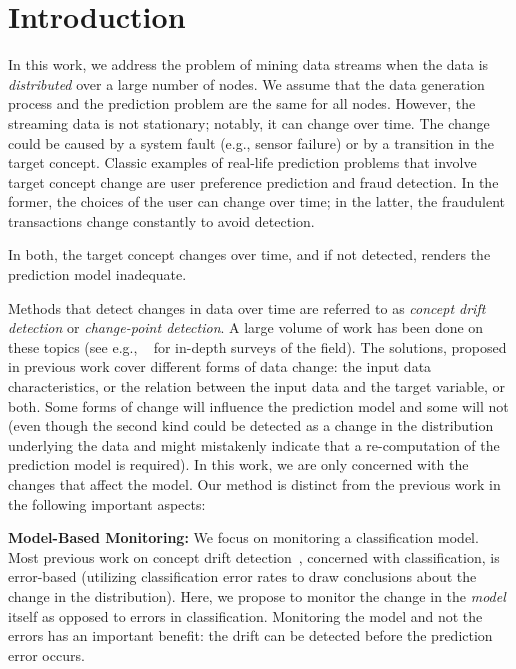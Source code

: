 \documentclass{sig-alternate-05-2015}
\begin{document}
%
%

%
%
\printccsdesc



\section{Introduction}
In this work, we address the problem of mining data streams when the data is
{\em distributed} over a large number of nodes. We assume that the data generation process and the prediction problem are the same for all nodes. However, the streaming data is not stationary; notably, it can change over time. The change could be caused by a system fault (e.g., sensor failure) or by a transition in the target concept. Classic examples of real-life prediction problems that involve target concept change are user preference prediction and fraud detection. In the former, the choices of the user can change over time; in the latter, the fraudulent transactions change constantly to avoid detection.








In both, the target concept changes over time, and if not detected, renders the prediction model inadequate.

Methods that detect changes in data over time are referred to as {\em concept drift detection} or {\em change-point detection}.
A large volume of work has been done on these topics
(see e.g., ~\cite{basseville1993detection,brodsky2013nonparametric,ChenGupta2000,Tsymbal,Gama2014}
for in-depth surveys of the field).
The solutions, proposed in previous work cover different forms of data change:
the input data characteristics, or the relation between the input data and the target variable, or both.
Some forms of change will influence the prediction model and some will not
(even though the second kind could be detected as a change in the distribution underlying the data and
might mistakenly indicate that a re-computation of the prediction model is required).
In this work, we are only concerned with the changes that affect the model.
Our method is distinct from the previous work in the following important aspects:


\noindent \textbf{Model-Based Monitoring:} We focus on monitoring a classification model.
Most previous work on concept drift detection~\cite{baena2006early,gama2004learning,Nishida2007},
concerned with classification, is error-based  (utilizing classification error rates to
draw conclusions about the change in the distribution).
Here, we propose to monitor the change in the {\em model} itself as opposed to errors in classification.
Monitoring the model and not the errors has an important benefit: the drift can
be detected before the prediction error occurs.
\end{document}
